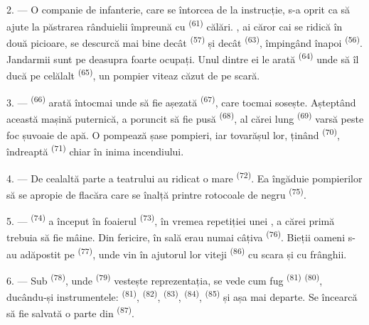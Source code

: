 2. --- O companie de infanterie, care se întorcea de la instrucție, s-a oprit ca să
ajute la păstrarea rânduielii împreună cu 
\textsuperscript{(61)} călări. , ai căror cai se ridică în două
picioare, se descurcă mai bine decât  \textsuperscript{(57)} și
decât  \textsuperscript{(63)}, împingând înapoi
 \textsuperscript{(56)}. Jandarmii sunt pe deasupra foarte
ocupați. Unul dintre ei le arată  \textsuperscript{(64)} unde
să îl ducă pe celălalt  \textsuperscript{(65)}, un pompier viteaz
căzut de pe scară.

3. ---  \textsuperscript{(66)} arată întocmai unde să fie așezată
 \textsuperscript{(67)}, care tocmai sosește. Așteptând
această mașină puternică, a poruncit să fie pusă 
\textsuperscript{(68)}, al cărei  lung \textsuperscript{(69)} varsă
peste foc șuvoaie de apă. O pompează șase pompieri, iar tovarășul lor, ținând
 \textsuperscript{(70)}, îndreaptă 
\textsuperscript{(71)} chiar în inima incendiului.

4. --- De cealaltă parte a teatrului au ridicat o  mare
\textsuperscript{(72)}. Ea îngăduie pompierilor să se apropie de flacăra care se
înalță printre rotocoale de  negru \textsuperscript{(75)}.

\VUsaut{5.0mm}
\VUsaut{3.4mm}

5. ---  \textsuperscript{(74)} a început în foaierul
 \textsuperscript{(73)}, în vremea repetiției unei
, a cărei primă  trebuia să fie mâine. Din
fericire, în sală erau numai câțiva  \textsuperscript{(76)}.
Bieții oameni s-au adăpostit pe  \textsuperscript{(77)}, unde vin
în ajutorul lor  viteji \textsuperscript{(86)} cu scara și cu
frânghii.

6. --- Sub  \textsuperscript{(78)}, unde 
\textsuperscript{(79)} vestește reprezentația, se vede cum fug 
\textsuperscript{(81)}  \textsuperscript{(80)}, ducându-și
instrumentele:  \textsuperscript{(81)}, 
\textsuperscript{(82)},  \textsuperscript{(83)},
 \textsuperscript{(84)},  \textsuperscript{(85)} și
așa mai departe. Se încearcă să fie salvată o parte din 
\textsuperscript{(87)}.

